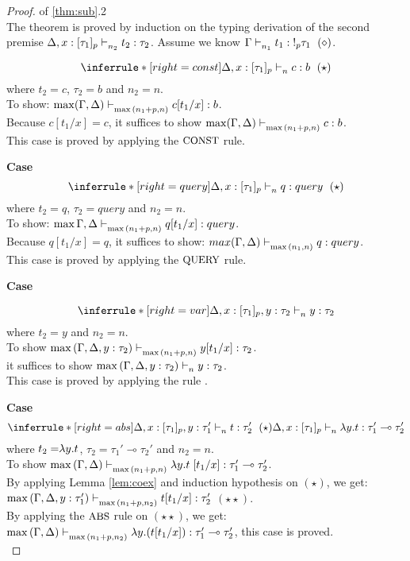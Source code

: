\documentclass{article}
\begin{document}
\newpage
\begin{proof} of \ref{thm:sub}.2 \\
  The theorem is proved by induction on the typing derivation of the second premise $\Delta, x: [\tau_1]_p \mathrel{\vdash_{n_2}^{} {t_2} : {\tau_2}}$. Assume we know $\Gamma \mathrel{\vdash_{n_1}^{} {t_1} : {!_p \tau_1}}~(\diamond)$.


$$
   \inferrule*[right = const]
   {\empty}
   {\Delta, x: [\tau_1]_p \jtype{n}{}{c}{b} ~(\star) }
$$
where $t_2 = c$, $\tau_2 = b$ and $n_2 = n$.\\
To show: $\max(\Gamma, \Delta) \mathrel{\vdash_{\max{(n_1 + p, n)}}^{} {c[t_1/x]} : {b}} $.\\
Because $c[t_1/x] = c$, it suffices to show $\max(\Gamma, \Delta) \mathrel{\vdash_{\max{(n_1 + p, n)}}^{} {c} : {b}} $.\\
This case is proved by applying the $\mbox{\small{CONST}}$ rule. 


\noindent \textbf{Case} 
$$
    \inferrule*[right = query]
   {\empty}
   {\Delta, x: [\tau_1]_p  \jtype{n}{}{q}{query} ~ (\star) }
$$
where $t_2 = q$, $\tau_2 = query$ and $n_2 = n$.\\
To show: $\max{\Gamma, \Delta} \mathrel{\vdash_{\max{(n_1 + p, n)}}^{} {q[t_1/x]} : {query}} $.\\
Because $q[t_1/x] = q$, it suffices to show: $max(\Gamma, \Delta) \mathrel{\vdash_{\max{(n_1, n)}}^{} {q} : {query}} $.\\
This case is proved by applying the $\mbox{\small{QUERY}}$ rule. 


\noindent \textbf{Case} 

$$
    \inferrule*[ right = var]
   {\empty}
   {\Delta, x:[\tau_1]_p, y : \tau_2 \jtype{n}{}{y}{\tau_2}} 
$$
where $t_2 = y$ and $n_2 = n$.\\ 
To show $\max{(\Gamma, \Delta, y : \tau_2)} \mathrel{\vdash_{\max{(n_1 + p, n)}}^{} {y[t_1/x]} : {\tau_2}} $.\\
it suffices to show $\max{(\Gamma, \Delta, y : \tau_2)} \mathrel{\vdash_{n}^{} {y} : {\tau_2}}$.\\
This case is proved by applying the rule .

\noindent \textbf{Case} 
$$
    \inferrule*[right = abs]
   {\Delta, x: [\tau_1]_p, y: \tau_1' \jtype{n}{}{t}{\tau_2'}~(\star)}
   { \Delta, x: [\tau_1]_p \jtype{n}{}{\abs{y}{t}}{\tau_1' \multimap \tau_2'}  }
$$
where $t_2 = \mathrel { \lambda {y} . {t} }$, $\tau_2 = \tau_1' \multimap \tau_2'$ and $n_2 = n$.\\
To show $\max{(\Gamma, \Delta)} \mathrel{\vdash_{\max{(n_1 + p, n)}}^{} {\mathrel { \lambda {y} . {t} }[t_1/x]} : {\tau_1' \multimap \tau_2'}}$.\\
By applying Lemma \ref{lem:coex}  and induction hypothesis on $(\star)$, we get:\\ $\max{(\Gamma, \Delta,  y: \tau_1')} \mathrel{\vdash_{\max{(n_1 + p, n_2)}}^{} {{t}[t_1/x]} : { \tau_2'}}$ $(\star \star)$.\\
By applying the $\mbox{\small{ABS}}$ rule on $(\star \star)$, we get: $\max{(\Gamma, \Delta)} \mathrel{\vdash_{\max{(n_1 + p, n_2)}}^{} {\mathrel { \lambda {y} . {({t}[t_1/x])} }} : {\tau_1' \multimap \tau_2'}}$, this case is proved.\\



\end{proof}
\end{document}

